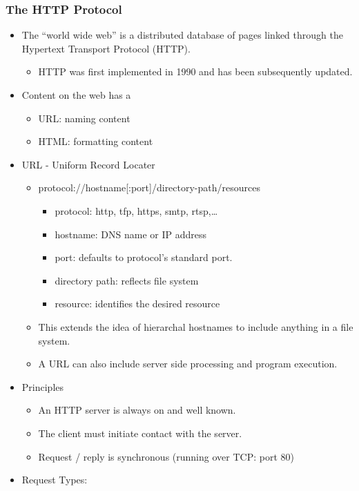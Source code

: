 \documentclass[]{article}
\providecommand{\tightlist}{%
  \setlength{\itemsep}{0pt}\setlength{\parskip}{0pt}}
\begin{document}
\hypertarget{the-http-protocol}{%
\subsubsection{The HTTP Protocol}\label{the-http-protocol}}

\begin{itemize}
\item
  The ``world wide web'' is a distributed database of pages linked
  through the Hypertext Transport Protocol (HTTP).

  \begin{itemize}
  \tightlist
  \item
    HTTP was first implemented in 1990 and has been subsequently
    updated.
  \end{itemize}
\item
  Content on the web has a

  \begin{itemize}
  \tightlist
  \item
    URL: naming content
  \item
    HTML: formatting content
  \end{itemize}
\item
  URL - Uniform Record Locater

  \begin{itemize}
  \tightlist
  \item
    protocol://hostname{[}:port{]}/directory-path/resources

    \begin{itemize}
    \tightlist
    \item
      protocol: http, tfp, https, smtp, rtsp,\ldots{}
    \item
      hostname: DNS name or IP address
    \item
      port: defaults to protocol's standard port.
    \item
      directory path: reflects file system
    \item
      resource: identifies the desired resource
    \end{itemize}
  \item
    This extends the idea of hierarchal hostnames to include anything in
    a file system.
  \item
    A URL can also include server side processing and program execution.
  \end{itemize}
\item
  Principles

  \begin{itemize}
  \tightlist
  \item
    An HTTP server is always on and well known.
  \item
    The client must initiate contact with the server.
  \item
    Request / reply is synchronous (running over TCP: port 80)
  \end{itemize}
\item
  Request Types:


\end{itemize}
\end{document}
